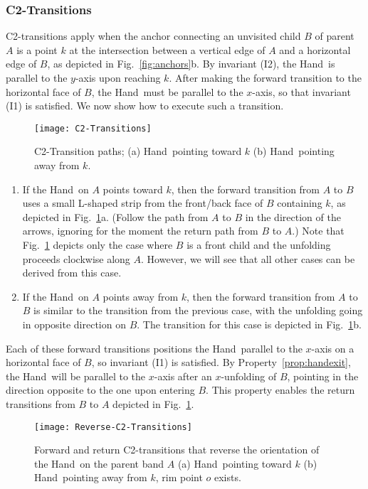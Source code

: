 \documentclass[11pt]{article}
\newcommand{\squeezelist}{\setlength{\itemsep}{0pt}}
\newcommand\hand{{\sc Hand}}
\begin{document}
\subsubsection{C2-Transitions}
\label{sec:C2}
C2-transitions apply when the anchor connecting an unvisited child $B$ of parent $A$ is a point $k$ at the intersection between a vertical edge of $A$ and a horizontal edge of $B$, as depicted in Fig.~\ref{fig:anchors}b.
By invariant (I2), the \hand\ is parallel to the $y$-axis upon reaching $k$. After making the forward transition to the horizontal face of $B$, the \hand\ must be parallel to the $x$-axis, so that invariant (I1) is satisfied. We now show how to execute such a transition.
\begin{figure}[hp]
\centering
\texttt{[image: C2-Transitions]}
\caption{C2-Transition paths; (a) \hand\ pointing toward $k$ (b) \hand\ pointing away from $k$.}
\label{fig:C2-transitions}
\end{figure}
\begin{enumerate}
\squeezelist
\item If the \hand\ on $A$ points toward $k$, then the forward transition from $A$ to $B$ uses a small L-shaped strip from the front/back face of $B$ containing $k$, as depicted in Fig.~\ref{fig:C2-transitions}a. (Follow the path from $A$ to $B$ in the direction of the arrows, ignoring for the moment the return path from $B$ to $A$.) Note that Fig.~\ref{fig:C2-transitions} depicts only the case where $B$ is a front child and the unfolding proceeds clockwise along $A$. However, we will see that all other cases can be derived from this case.
\item If the \hand\ on $A$ points away from $k$, then the forward transition from $A$ to $B$ is similar to the transition from the previous case, with the unfolding going in opposite direction on $B$. The transition for this case is depicted in Fig.~\ref{fig:C2-transitions}b.
\end{enumerate}
Each of these forward transitions positions the \hand\ parallel to the $x$-axis on a horizontal face of $B$, so  invariant (I1) is satisfied. By Property~\ref{prop:handexit}, the \hand\ will be parallel to the $x$-axis after an $x$-unfolding of $B$, pointing in the direction opposite to the one upon entering $B$. This property enables the return transitions from $B$ to $A$ depicted in Fig.~\ref{fig:C2-transitions}.

\begin{figure}[htbp]
\centering
\texttt{[image: Reverse-C2-Transitions]}
\caption{Forward and return C2-transitions that reverse the orientation of the \hand\ on the parent band $A$ (a) \hand\ pointing toward $k$ (b) \hand\ pointing away from $k$, rim point $o$ exists.}
\label{fig:Reverse-C2-transitions}
\end{figure}
\end{document}
